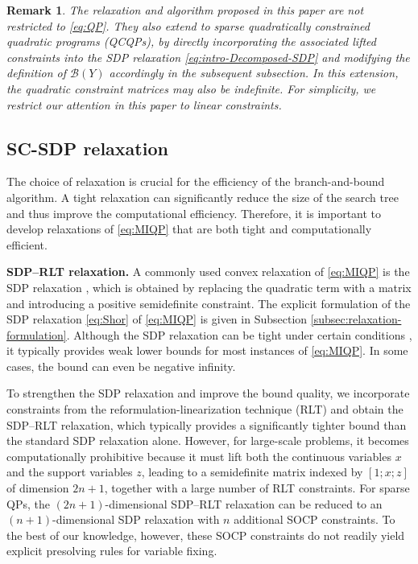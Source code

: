 \documentclass[11pt]{article}
\def\B{\mathcal{B}}
\def\tb#1{\textbf{#1}}
\theoremstyle{plain}
\newtheorem{remark}{Remark}
\begin{document}
\begin{remark}\label{rmk:generalization}
    The relaxation and algorithm proposed in this paper are not restricted to \eqref{eq:QP}. They also extend to sparse quadratically constrained quadratic programs (QCQPs), by directly incorporating the associated lifted constraints into the SDP relaxation \eqref{eq:intro-Decomposed-SDP} and modifying the definition of $\B(Y)$ accordingly in the subsequent subsection. In this extension, the quadratic constraint matrices may also be indefinite. For simplicity, we restrict our attention in this paper to linear constraints.
\end{remark}

\subsection{SC-SDP relaxation}\label{subsec:SDP-RLT-formulation}

The choice of relaxation is crucial for the efficiency of the branch-and-bound algorithm. A tight relaxation can significantly reduce the size of the search tree and thus improve the computational efficiency. 
Therefore, it is important to develop relaxations of \eqref{eq:MIQP} that are both tight and computationally efficient.

\medskip
\noindent\tb{SDP--RLT relaxation.} 
A commonly used convex relaxation of \eqref{eq:MIQP} is the SDP relaxation \cite{shor1990dual}, which is obtained by replacing the quadratic term with a matrix and introducing a positive semidefinite constraint. The explicit formulation of the SDP relaxation \eqref{eq:Shor} of \eqref{eq:MIQP} is given in Subsection \ref{subsec:relaxation-formulation}. 
Although the SDP relaxation can be tight under certain conditions \cite{burer2020exact,wang2022tightness}, it typically provides weak lower bounds for most instances of \eqref{eq:MIQP}. In some cases, the bound can even be negative infinity.

To strengthen the SDP relaxation and improve the bound quality, we incorporate constraints from the reformulation-linearization technique (RLT) \cite{sherali2007rlt,RiNNALplus} and obtain the SDP--RLT relaxation, which typically provides a significantly tighter bound than the standard SDP relaxation alone. However, for large-scale problems, it becomes computationally prohibitive because it must lift both the continuous variables $x$ and the support variables $z$, leading to a semidefinite matrix indexed by $[1;x;z]$ of dimension $2n+1$, together with a large number of RLT constraints.
{For sparse QPs, the $(2n+1)$-dimensional SDP--RLT relaxation can be reduced to an $(n+1)$-dimensional SDP relaxation with $n$ additional SOCP constraints. To the best of our knowledge, however, these SOCP constraints do not readily yield explicit presolving rules for variable fixing.}
\end{document}

